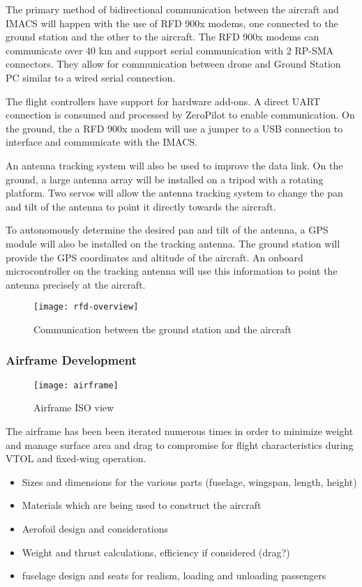 The primary method of bidirectional communication between the aircraft and
IMACS will happen with the use of RFD 900x modems, one connected to the ground
station and the other to the aircraft. The RFD 900x modems can communicate over
40 km and support serial communication with 2 RP-SMA connectors. They allow for
communication between drone and Ground Station PC similar to a wired serial
connection. 

The flight controllers have support for hardware add-ons. A direct UART
connection is consumed and processed by ZeroPilot to enable communication. On
the ground, the a RFD 900x modem will use a jumper to a USB connection to
interface and communicate with the IMACS.

An antenna tracking system will also be used to improve the data link. On the
ground, a large antenna array will be installed on a tripod with a rotating
platform. Two servos will allow the antenna tracking system to change the pan
and tilt of the antenna to point it directly towards the aircraft.

To autonomously determine the desired pan and tilt of the antenna, a GPS module will also be installed on the tracking antenna. The ground station will provide the GPS coordinates and altitude of the aircraft. An onboard microcontroller on the tracking antenna will use this information to point the antenna precisely at the aircraft.

\begin{figure}[h]
	\caption{Communication between the ground station and the aircraft}
	\centering
	\texttt{[image: rfd-overview]}
\end{figure}

\subsubsection{Airframe Development}

\begin{figure}[h]
	\caption{Airframe ISO view}
	\centering
	\texttt{[image: airframe]}
\end{figure}

The airframe has been been iterated numerous times in order to minimize weight and manage surface area and drag to compromise for flight characteristics during VTOL and fixed-wing operation.


\begin{itemize}
	\item Sizes and dimensions for the various parts (fuselage, wingspan,
		length, height)
	\item Materials which are being used to construct the aircraft
	\item Aerofoil design and considerations
	\item Weight and thrust calculations, efficiency if considered (drag?)
	\item fuselage design and seats for realism, loading and unloading passengers
\end{itemize}

